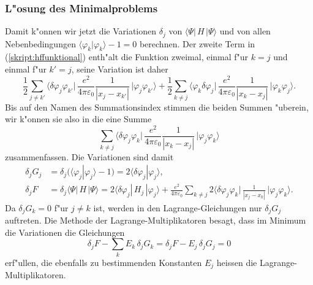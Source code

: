 \subsubsection{L"osung des Minimalproblems}
Damit k"onnen wir jetzt die Variationen $\delta_j$
von $\langle\Psi|\,H\,|\Psi\rangle$
und von allen Nebenbedingungen $\langle\varphi_k|\varphi_k\rangle-1=0$
berechnen.
Der zweite Term in (\ref{skript:hffunktional}) enth"alt die Funktion
zweimal, einmal f"ur $k=j$ und einmal f"ur $k'=j$, seine Variation
ist daher
\begin{equation*}
\frac12\sum_{j\ne k'}
\biggl\langle\delta\varphi_j\varphi_{k'}\biggl|\,
\frac{e^2}{4\pi\varepsilon_0}
\frac{1}{|x_j-x_{k'}|}
\,\biggr|\varphi_j\varphi_{k'}\biggr\rangle
+
\frac12\sum_{k\ne j}
\biggl\langle\varphi_k\delta\varphi_j\biggl|\,
\frac{e^2}{4\pi\varepsilon_0}
\frac{1}{|x_k-x_j|}
\,\biggr|\varphi_k\varphi_j\biggr\rangle.
\end{equation*}
Bis auf den Namen des Summationsindex stimmen die beiden
Summen "uberein, wir k"onnen sie also in die eine Summe
\begin{equation*}
\sum_{k\ne j}
\biggl\langle\delta\varphi_j\varphi_k\biggl|\,
\frac{e^2}{4\pi\varepsilon_0}
\frac{1}{|x_k-x_j|}
\,\biggr|\varphi_j\varphi_k\biggr\rangle
\end{equation*}
zusammenfassen. Die Variationen sind damit
\begin{align}
\delta_j G_j
&=
\delta_j(\langle\varphi_j|\varphi_j\rangle-1)
=
2\langle\delta\varphi_j|\varphi_j\rangle,
\label{skript:variationGj}
\\
\delta_j F
&=
\delta_j\langle\Psi|\,H\,|\Psi\rangle
=
2 \langle\delta\varphi_j|\,H_j\,|\varphi_j\rangle
+
\frac{e^2}{4\pi\varepsilon_0}
\sum_{k\ne j}
2
\biggl\langle\delta\varphi_j\varphi_k\biggl|\,
\frac{1}{|x_j-x_k|}
\,\biggr|\varphi_j\varphi_k \biggr\rangle.
\label{skript:variationF}
\end{align}
%
Da $\delta_jG_k=0$ f"ur $j\ne k$ ist, werden in den Lagrange-Gleichungen
nur $\delta_jG_j$ auftreten.
Die Methode der Lagrange-Multiplikatoren besagt, dass im Minimum
die Variationen die Gleichungen
\begin{equation}
\delta_j F - \sum_{k} E_k\, \delta_j G_k
=
\delta_j F -  E_j\, \delta_j G_j
=
0
\label{skript:lagrangeequation}
\end{equation}
erf"ullen, die ebenfalls zu bestimmenden Konstanten $E_j$ heissen 
die Lagrange-Multiplikatoren.

